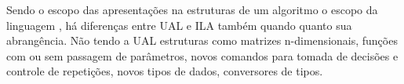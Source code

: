 Sendo o escopo das apresentações na estruturas de um algoritmo o escopo da linguagem \cite[p.~22]{spallanzani2000etal}, há diferenças entre UAL e ILA também quando quanto sua abrangência. Não tendo a UAL estruturas como matrizes n-dimensionais, funções com ou sem passagem de parâmetros, novos comandos para tomada de decisões e controle de repetições, novos tipos de dados, conversores de tipos.

\ifdraft{}{




%
%
%
%
%
%
%
%
%
%
%
%
%
%
%
%
%



}
